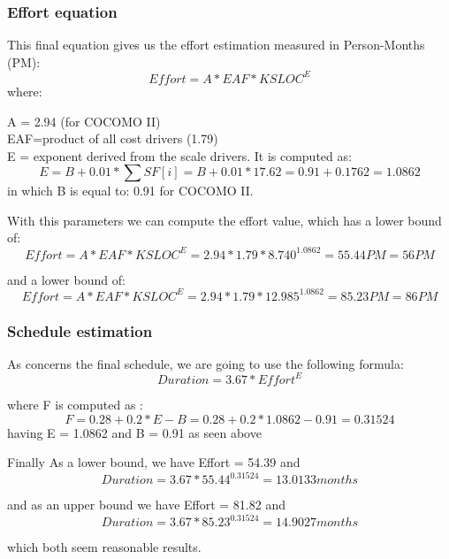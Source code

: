 \documentclass{article}
\begin{document}
\begin{flushleft}
\subsubsection{Effort equation}%
This final equation gives us the effort estimation measured in Person-Months (PM):
 \[Effort = A * EAF * KSLOC^E    \]
 where:
 
 A = 2.94 (for COCOMO II)\\
EAF=product of all cost drivers (1.79)\\
E = exponent derived from the scale drivers. It is computed as:\\
\[E = B+ 0.01 * \sum {SF[i]} = B+ 0.01 * 17.62 = 0.91 + 0.1762 = 1.0862\]
 in which B is equal to: 0.91 for COCOMO II. 
 
 
 With this parameters we can compute the effort value, which has a lower bound of:
  \[Effort = A * EAF * KSLOC^E   = 2.94 * 1.79 * 8.740 ^ {1.0862}  = 55.44PM = 56PM\]
 
 and a lower bound of:
  \[Effort = A * EAF * KSLOC^E  = 2.94 * 1.79 * 12.985 ^ {1.0862}  = 85.23PM = 86PM \]
\newpage
\subsubsection{Schedule estimation}%
As concerns the final schedule, we are going to use the following formula:
\[Duration = 3.67 * Effort^E\]

where F is computed as :
\[F = 0.28 + 0.2 * {E - B} = 0.28 + 0.2 * {1.0862 - 0.91} = 0.31524\]
having E = 1.0862 and B = 0.91 as seen above


Finally As a lower bound, we have Effort = 54.39 and
\[ Duration = 3.67 * 55.44^{0.31524} = 13.0133 months\]

and as an upper bound  we have Effort = 81.82 and
\[ Duration = 3.67 * 85.23^{0.31524} =14.9027 months  \]

which both seem reasonable results.





\end{flushleft}
\end{document}
